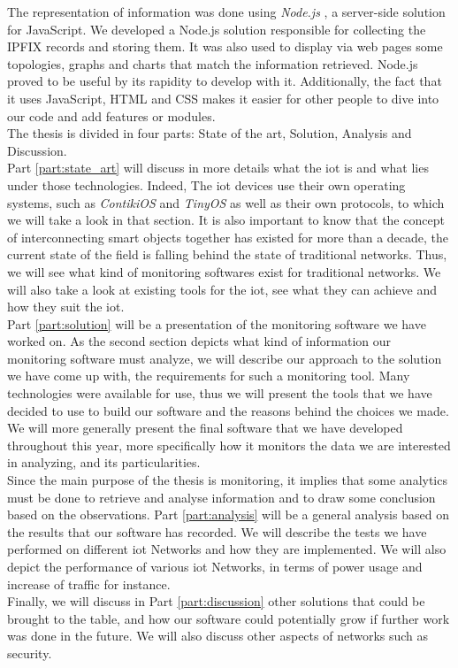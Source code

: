 The representation of information was done using \textit{Node.js} \cite{website:nodejs}, a server-side solution for JavaScript. We developed a Node.js solution responsible for collecting the IPFIX records and storing them. It was also used to display via web pages some topologies, graphs and charts that match the information retrieved. Node.js proved to be useful by its rapidity to develop with it. Additionally, the fact that it uses JavaScript, HTML and CSS makes it easier for other people to dive into our code and add features or modules. \\

The thesis is divided in four parts: State of the art, Solution, Analysis and Discussion.\\

Part \ref{part:state_art} will discuss in more details what the \acrlong{iot} is and what lies under those technologies. Indeed, The \acrshort{iot} devices use their own operating systems, such as \textit{ContikiOS} and \textit{TinyOS} as well as their own protocols, to which we will take a look in that section. It is also important to know that the concept of interconnecting smart objects together has existed for more than a decade, the current state of the field is falling behind the state of traditional networks. Thus, we will see what kind of monitoring softwares exist for traditional networks. We will also take a look at existing tools for the \acrshort{iot}, see what they can achieve and how they suit the \acrshort{iot}.\\

Part \ref{part:solution} will be a presentation of the monitoring software we have worked on. As the second section depicts what kind of information our monitoring software must analyze, we will describe our approach to the solution we have come up with, the requirements for such a monitoring tool. Many technologies were available for use, thus we will present the tools that we have decided to use to build our software and the reasons behind the choices we made. We will more generally present the final software that we have developed throughout this year, more specifically how it monitors the data we are interested in analyzing, and its particularities. \\

Since the main purpose of the thesis is monitoring, it implies that some analytics must be done to retrieve and analyse information and to draw some conclusion based on the observations. Part \ref{part:analysis} will be a general analysis based on the results that our software has recorded. We will describe the tests we have performed on different \acrshort{iot} Networks and how they are implemented. We will also depict the performance of various \acrshort{iot} Networks, in terms of power usage and increase of traffic for instance.\\

Finally, we will discuss in Part \ref{part:discussion} other solutions that could be brought to the table, and how our software could potentially grow if further work was done in the future. We will also discuss other aspects of networks such as security.
